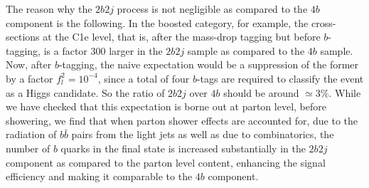 The reason why the  $2b2j$ process
is not negligible as compared to the $4b$ component
is the following.
%
In the boosted category, for example,
the cross-sections at the C1e
level, that is, after the mass-drop tagging but before
$b$-tagging, is a factor 300 larger in the $2b2j$
sample as compared to the $4b$ sample.
%
Now, after $b$-tagging, the naive expectation would
be a suppression of the former by a factor $f_l^2 =10^{-4}$,
since a total of four $b$-tags are required to classify the
event as a Higgs candidate.
%
So the ratio of $2b2j$ over $4b$ should be
around $\simeq 3\%$.
While  we have checked that this expectation is borne
out at parton level, before showering,
we find that  when parton shower effects
are accounted for, due to the radiation of $b\bar{b}$ pairs from the
light jets as well as due to combinatorics, the
number of  $b$ quarks in the  final state is
increased substantially in the $2b2j$ component as compared
to the parton level content,
enhancing the signal efficiency and making
it comparable to the $4b$ component.


